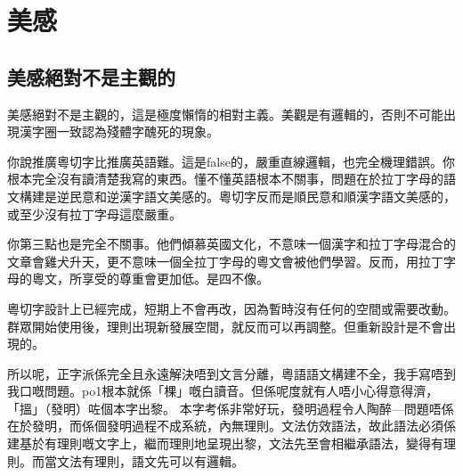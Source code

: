 \chapter{美感}

\section{美感絕對不是主觀的}

美感絕對不是主觀的，這是極度懶惰的相對主義。美觀是有邏輯的，否則不可能出現漢字圈一致認為殘體字醜死的現象。

你說推廣粵切字比推廣英語難。這是false的，嚴重直線邏輯，也完全機理錯誤。你根本完全沒有讀清楚我寫的東西。懂不懂英語根本不關事，問題在於拉丁字母的語文構建是逆民意和逆漢字語文美感的。粵切字反而是順民意和順漢字語文美感的，或至少沒有拉丁字母這麼嚴重。

你第三點也是完全不關事。他們傾慕英國文化，不意味一個漢字和拉丁字母混合的文章會雞犬升天，更不意味一個全拉丁字母的粵文會被他們學習。反而，用拉丁字母的粵文，所享受的尊重會更加低。是四不像。

粵切字設計上已經完成，短期上不會再改，因為暫時沒有任何的空間或需要改動。群眾開始使用後，理則出現新發展空間，就反而可以再調整。但重新設計是不會出現的。

所以呢，正字派係完全且永遠解決唔到文言分離，粵語語文構建不全，我手寫唔到我口嘅問題。po1根本就係「棵」嘅白讀音。但係呢度就有人唔小心得意得濟，「搵」（發明）咗個本字出黎。
本字考係非常好玩，發明過程令人陶醉—問題唔係在於發明，而係個發明過程不成系統，內無理則。文法仿效語法，故此語法必須係建基於有理則嘅文字上，繼而理則地呈現出黎，文法先至會相繼承語法，變得有理則。而當文法有理則，語文先可以有邏輯。

